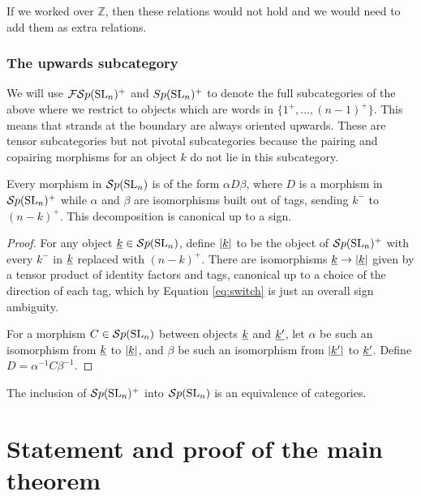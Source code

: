 \documentclass[10pt,leqno]{article}
\begin{document}
\begin{rem}
If we worked over $ \mathbb Z$, then these relations would not hold and we would need to add them as extra relations.
\end{rem}


\subsubsection{The upwards subcategory}
We will use ${\mathcal{FS}p}({\rm{SL}}_n)^+$ and $Sp({\rm{SL}}_n)^+$ to denote the full subcategories of the above where we restrict to objects which are words in $\{1^+,\ldots,(n-1)^+\}$. This means that strands at the boundary are always oriented upwards. These are tensor subcategories but not pivotal subcategories because the pairing and copairing morphisms for an object $k$ do not lie in this subcategory.

\begin{lem}
Every morphism in ${\mathcal{S}p}({\rm{SL}}_n)$ is of the form $\alpha D \beta$, where $D$ is a morphism in ${\mathcal{S}p}({\rm{SL}}_n)^+$ while $\alpha$ and $\beta$ are isomorphisms built out of tags, sending $k^-$ to $(n-k)^+$.  This decomposition is canonical up to a sign.
\end{lem}
\begin{proof}
For any object ${\underline{k}} \in {\mathcal{S}p}({\rm{SL}}_n)$, define $\left|{\underline{k}}\right|$ to be the object of ${\mathcal{S}p}({\rm{SL}}_n)^+$ with every $k^-$ in ${\underline{k}}$ replaced with $(n-k)^+$. There are isomorphisms ${\underline{k}} \to \left|{\underline{k}}\right|$ given by a tensor product of identity factors and tags, canonical up to a choice of the direction of each tag, which by Equation \eqref{eq:switch} is just an overall sign ambiguity.

For a morphism $C \in {\mathcal{S}p}({\rm{SL}}_n)$ between objects ${\underline{k}}$ and ${\underline{k'}}$, let $\alpha$ be such an isomorphism from ${\underline{k}}$ to $\left|{\underline{k}}\right|$, and $\beta$ be such an isomorphism from $\left|{\underline{k'}}\right|$ to ${\underline{k'}}$. Define $D = \alpha^{-1} C \beta^{-1}$.
\end{proof}

\begin{cor}
The inclusion of ${\mathcal{S}p}({\rm{SL}}_n)^+$ into $ {\mathcal{S}p}({\rm{SL}}_n) $ is an equivalence of categories.
\end{cor}

\section{Statement and proof of the main theorem}\label{sec:theorem}
\end{document}
